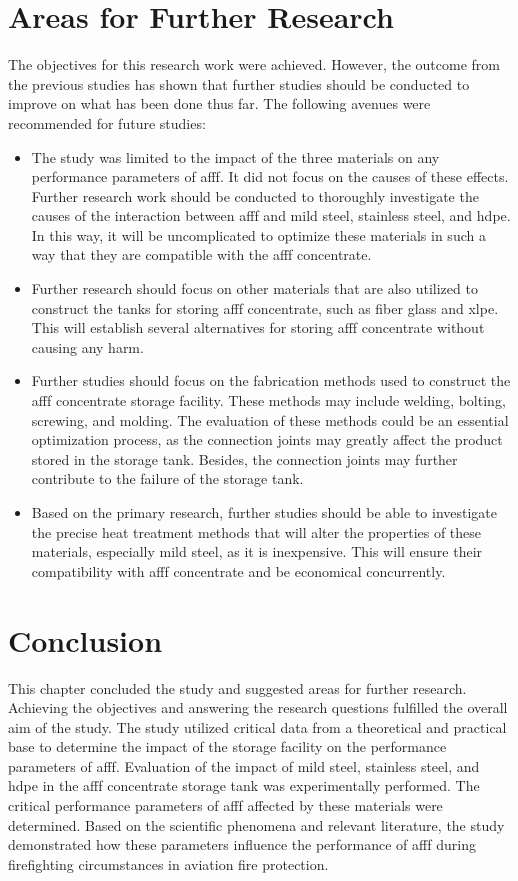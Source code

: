 \section{Areas for Further Research}
The objectives for this research work were achieved. However, the outcome from the previous studies has shown that further studies should be conducted to improve on what has been done thus far. The following avenues were recommended for future studies: 

\begin{itemize}
    \item The study was limited to the impact of the three materials on any performance parameters of \acrshort{afff}. It did not focus on the causes of these effects. Further research work should be conducted to thoroughly investigate the causes of the interaction between \acrshort{afff} and mild steel, stainless steel, and \acrshort{hdpe}. In this way, it will be uncomplicated to optimize these materials in such a way that they are compatible with the \acrshort{afff} concentrate.
    \item Further research should focus on other materials that are also utilized to construct the tanks for storing \acrshort{afff} concentrate, such as fiber glass and \acrfull{xlpe}. This will establish several alternatives for storing \acrshort{afff} concentrate without causing any harm. 
    \item  Further studies should focus on the fabrication methods used to construct the \acrshort{afff} concentrate storage facility. These methods may include welding, bolting, screwing, and molding. The evaluation of these methods could be an essential optimization process, as the connection joints may greatly affect the product stored in the storage tank. Besides, the connection joints may further contribute to the failure of the storage tank. 
    \item Based on the primary research, further studies should be able to investigate the precise heat treatment methods that will alter the properties of these materials, especially mild steel, as it is inexpensive. This will ensure their compatibility with \acrshort{afff} concentrate and be economical concurrently.   
\end{itemize}

\section{Conclusion}
This chapter concluded the study and suggested areas for further research. Achieving the objectives and answering the research questions fulfilled the overall aim of the study. The study utilized critical data from a theoretical and practical base to determine the impact of the storage facility on the performance parameters of \acrshort{afff}. Evaluation of the impact of mild steel, stainless steel, and \acrshort{hdpe} in the \acrshort{afff} concentrate storage tank was experimentally performed. The critical performance parameters of \acrshort{afff} affected by these materials were determined. Based on the scientific phenomena and relevant literature, the study demonstrated how these parameters influence the performance of \acrshort{afff} during firefighting circumstances in aviation fire protection.